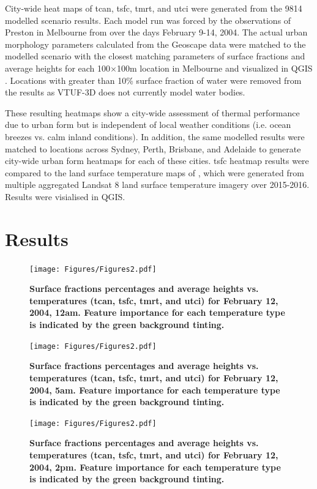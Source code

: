 \documentclass[final,3p,times,authoryear]{elsarticle}
\begin{document}
City-wide heat maps of \gls{tcan}, \gls{tsfc}, \gls{tmrt}, and \gls{utci} were generated from the 9814 modelled scenario results. Each model run was forced by the observations of Preston in Melbourne from \cite{Coutts2007} over the days February 9-14, 2004. The actual urban morphology parameters calculated from the Geoscape data were matched to the modelled scenario with the closest matching parameters of surface fractions and average heights for each 100$\times$100m location in Melbourne and visualized in QGIS \citep{QGIS2009}. Locations with greater than 10\% surface fraction of water were removed from the results as VTUF-3D does not currently model water bodies.

These resulting heatmaps show a city-wide assessment of thermal performance due to urban form but is independent of local weather conditions (i.e. ocean breezes vs. calm inland conditions). In addition, the same modelled results were matched to locations across Sydney, Perth, Brisbane, and Adelaide to generate city-wide urban form heatmaps for each of these cities.  \gls{tsfc} heatmap results were compared to the land surface temperature maps of \cite{Devereux2017}, which were generated from multiple aggregated Landsat 8 land surface temperature imagery over 2015-2016. Results were visialised in QGIS.

\section{Results}\label{sec:results}




\begin{figure}
\centering
\texttt{[image: Figures/Figures2.pdf]}
\caption{\bf Surface fractions percentages and average heights vs. temperatures (\gls{tcan}, \gls{tsfc}, \gls{tmrt}, and \gls{utci}) for February 12, 2004, 12am. Feature importance for each temperature type is indicated by the green background tinting.}
 \label{fig:box0}
\end{figure} 

\begin{figure}
\centering
\texttt{[image: Figures/Figures2.pdf]}
\caption{\bf Surface fractions percentages and average heights vs. temperatures (\gls{tcan}, \gls{tsfc}, \gls{tmrt}, and \gls{utci}) for February 12, 2004, 5am. Feature importance for each temperature type is indicated by the green background tinting.}
 \label{fig:box5}
\end{figure} 

\begin{figure}
\centering
\texttt{[image: Figures/Figures2.pdf]}
\caption{\bf Surface fractions percentages and average heights vs. temperatures (\gls{tcan}, \gls{tsfc}, \gls{tmrt}, and \gls{utci}) for February 12, 2004, 2pm. Feature importance for each temperature type is indicated by the green background tinting.}
 \label{fig:box14}
\end{figure} 
\end{document}
